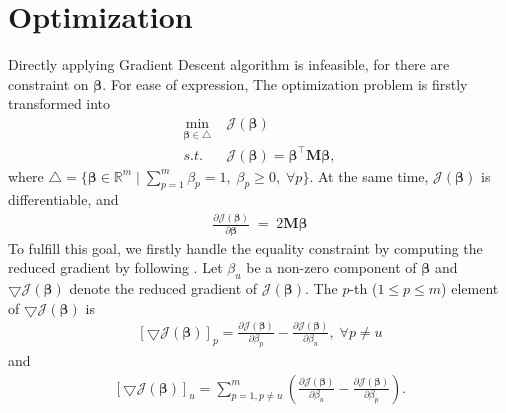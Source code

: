 \documentclass{article}
\begin{document}
\section{Optimization}

Directly applying Gradient Descent algorithm is infeasible, for there are constraint on $\boldsymbol{\beta}$.
For ease of expression, The optimization problem is firstly transformed into 
\begin{equation}\label{eq:obj_tran}
	\begin{split}
		\min_{\boldsymbol{\beta}\in \bigtriangleup} &\; \mathcal{J}(\boldsymbol{\beta}) \\
		s.t. & \; \mathcal{J}(\boldsymbol{\beta}) = \boldsymbol{\beta}^\top\mathbf{M}\boldsymbol{\beta},
	\end{split}
\end{equation}
where $\bigtriangleup = \{ \boldsymbol{\beta} \in \mathbb{R}^m\; |\; \sum_{p=1}^m \beta_p = 1,\; \beta_p\geq 0,\; \forall p\}$.
At the same time, $\mathcal{J}(\boldsymbol{\beta})$ is differentiable, and
\begin{equation}\label{eq:obj_derivative}
	\begin{split}
		\frac{\partial \mathcal{J}(\boldsymbol{\beta})}{\partial \boldsymbol{\beta}}\; =\; 2\mathbf{M}\boldsymbol{\beta}
	\end{split}
\end{equation}
To fulfill this goal, we firstly handle the equality constraint by computing the reduced gradient by following \cite{rakotomamonjy2008simplemkl}.
Let $\beta_u$ be a non-zero component of $\boldsymbol{\beta}$ and $\bigtriangledown \mathcal{J}(\boldsymbol{\beta})$ denote the reduced gradient of $\mathcal{J}(\boldsymbol{\beta})$.
The $p$-th ($1\leq p \leq m$) element of $\bigtriangledown \mathcal{J}(\boldsymbol{\beta})$ is
\begin{equation}\label{eq:p_derivative}
	\begin{split}
		[\bigtriangledown \mathcal{J}(\boldsymbol{\beta})]_p = \frac{\partial \mathcal{J}(\boldsymbol{\beta})}{\partial \beta_p} - \frac{\partial \mathcal{J}(\boldsymbol{\beta})}{\partial \beta_u},\; \forall p \neq u
	\end{split}
\end{equation}
and 
\begin{equation}\label{eq:u_derivative}
	\begin{split}
		[\bigtriangledown \mathcal{J}(\boldsymbol{\beta})]_u = \sum_{p=1,p\neq u}^m (\frac{\partial \mathcal{J}(\boldsymbol{\beta})}{\partial \beta_u} - \frac{\partial \mathcal{J}(\boldsymbol{\beta})}{\partial \beta_p}).
	\end{split}
\end{equation}
\end{document}
